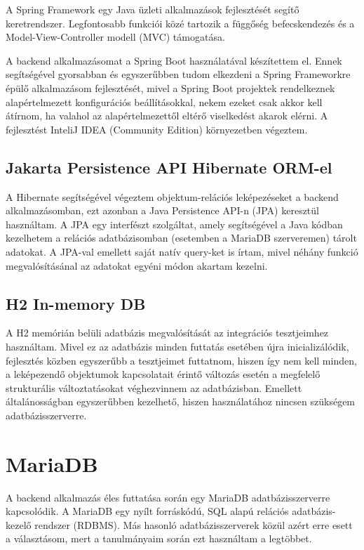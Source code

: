 \documentclass[a4paper,12pt]{report}
\theoremstyle{definition}
\theoremstyle{remark}
\begin{document}
A Spring Framework egy Java üzleti alkalmazások fejlesztését segítő keretrendszer. Legfontosabb funkciói közé tartozik a függőség befecskendezés és a Model-View-Controller modell (MVC) támogatása.

A backend alkalmazásomat a Spring Boot\cite{Springwebsite} használatával készítettem el. Ennek segítségével gyorsabban és egyszerűbben tudom elkezdeni a Spring Frameworkre épülő alkalmazásom fejlesztését, mivel a Spring Boot projektek rendelkeznek alapértelmezett konfigurációs beállításokkal, nekem ezeket csak akkor kell átírnom, ha valahol az alapértelmezettől eltérő viselkedést akarok elérni. A fejlesztést InteliJ IDEA (Community Edition)\cite{IDEAwebsite} környezetben végeztem.

	\subsection{Jakarta Persistence API Hibernate ORM-el}

A Hibernate\cite{Hibernatewebsite} segítségével végeztem objektum-relációs leképezéseket a backend alkalmazásomban, ezt azonban a Java Persistence API-n (JPA)\cite{JPAwebsite} keresztül használtam. A JPA egy interfészt szolgáltat, amely segítségével a Java kódban kezelhetem a relációs adatbázisomban (esetemben a MariaDB szerveremen) tárolt adatokat. A JPA-val emellett saját natív query-ket is írtam, mivel néhány funkció megvalósításánal az adatokat egyéni módon akartam kezelni.

	\subsection{H2 In-memory DB}

A H2\cite{H2website} memórián belüli adatbázis megvalósítását az integrációs tesztjeimhez használtam. Mivel ez az adatbázis minden futtatás esetében újra inicializálódik, fejlesztés közben egyszerűbb a tesztjeimet futtatnom, hiszen így nem kell minden, a leképezendő objektumok kapcsolatait érintő változás esetén a megfelelő strukturális változtatásokat véghezvinnem az adatbázisban. Emellett általánosságban egyszerűbben kezelhető, hiszen használatához nincsen szükségem adatbázisszerverre.

\section{MariaDB}

A backend alkalmazás éles futtatása során egy MariaDB\cite{Mariawebsite} adatbázisszerverre kapcsolódik. A MariaDB egy nyílt forráskódú, SQL alapú relációs adatbázis-kezelő rendszer (RDBMS). Más hasonló adatbázisszerverek közül azért erre esett a választásom, mert a tanulmányaim során ezt használtam a legtöbbet.
\end{document}
